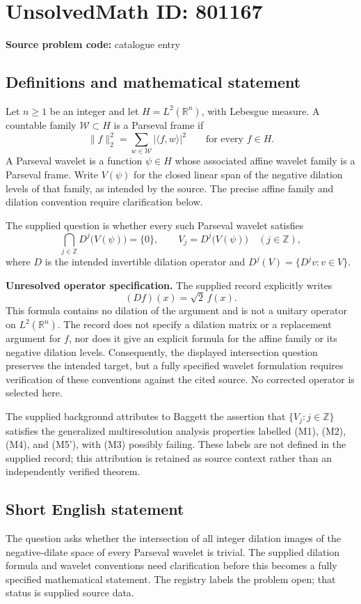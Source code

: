 \documentclass[11pt]{article}
\newcommand{\Z}{\mathbb{Z}}
\newcommand{\R}{\mathbb{R}}
\begin{document}
\section*{UnsolvedMath ID: 801167}
\textbf{Source problem code:} catalogue entry
\subsection{Definitions and mathematical statement}
Let \(n\geq 1\) be an integer and let \(H=L^2(\R^n)\), with Lebesgue measure. A countable family \(\mathcal W\subset H\) is a Parseval frame if
\[
\|f\|_2^2=\sum_{w\in\mathcal W}|\langle f,w\rangle|^2
\qquad\text{for every }f\in H.
\]
A Parseval wavelet is a function \(\psi\in H\) whose associated affine wavelet family is a Parseval frame. Write \(V(\psi)\) for the closed linear span of the negative dilation levels of that family, as intended by the source. The precise affine family and dilation convention require clarification below.

The supplied question is whether every such Parseval wavelet satisfies
\[
\bigcap_{j\in\Z}D^j\bigl(V(\psi)\bigr)=\{0\},
\qquad V_j=D^j\bigl(V(\psi)\bigr)\quad(j\in\Z),
\]
where \(D\) is the intended invertible dilation operator and \(D^j(V)=\{D^jv:v\in V\}\).

\textbf{Unresolved operator specification.} The supplied record explicitly writes
\[
(Df)(x)=\sqrt{2}\,f(x).
\]
This formula contains no dilation of the argument and is not a unitary operator on \(L^2(\R^n)\). The record does not specify a dilation matrix or a replacement argument for \(f\), nor does it give an explicit formula for the affine family or its negative dilation levels. Consequently, the displayed intersection question preserves the intended target, but a fully specified wavelet formulation requires verification of these conventions against the cited source. No corrected operator is selected here.

The supplied background attributes to Baggett the assertion that \(\{V_j:j\in\Z\}\) satisfies the generalized multiresolution analysis properties labelled (M1), (M2), (M4), and (M5'), with (M3) possibly failing. These labels are not defined in the supplied record; this attribution is retained as source context rather than an independently verified theorem.
\subsection{Short English statement}
The question asks whether the intersection of all integer dilation images of the negative-dilate space of every Parseval wavelet is trivial. The supplied dilation formula and wavelet conventions need clarification before this becomes a fully specified mathematical statement. The registry labels the problem open; that status is supplied source data.
\end{document}
